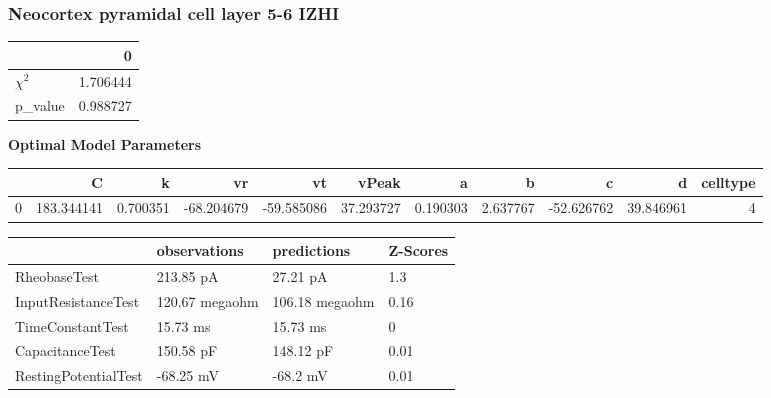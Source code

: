 \subsubsection{Neocortex pyramidal cell layer 5-6 IZHI}\begin{tabular}{lr}
\toprule
{} &         0 \\
\midrule
$\chi^{2}$ &  1.706444 \\
p\_value    &  0.988727 \\
\bottomrule
\end{tabular}
\textbf{Optimal Model Parameters} \begin{tabular}{lrrrrrrrrrr}
\toprule
{} &           C &         k &         vr &         vt &      vPeak &         a &         b &          c &          d &  celltype \\
\midrule
0 &  183.344141 &  0.700351 & -68.204679 & -59.585086 &  37.293727 &  0.190303 &  2.637767 & -52.626762 &  39.846961 &         4 \\
\bottomrule
\end{tabular}
\begin{tabular}{llll}
\toprule
{} &    observations &     predictions & Z-Scores \\
\midrule
RheobaseTest         &       213.85 pA &        27.21 pA &      1.3 \\
InputResistanceTest  &  120.67 megaohm &  106.18 megaohm &     0.16 \\
TimeConstantTest     &        15.73 ms &        15.73 ms &        0 \\
CapacitanceTest      &       150.58 pF &       148.12 pF &     0.01 \\
RestingPotentialTest &       -68.25 mV &        -68.2 mV &     0.01 \\
\bottomrule
\end{tabular}
